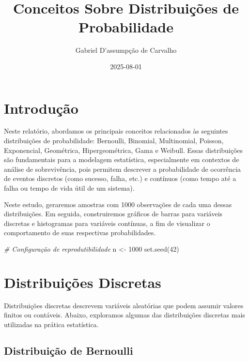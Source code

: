 \documentclass[
]{article}
\title{Conceitos Sobre Distribuições de Probabilidade}
\author{Gabriel D'assumpção de Carvalho}
\date{2025-08-01}
\newenvironment{Shaded}{\begin{snugshade}}{\end{snugshade}}
\newcommand{\CommentTok}[1]{\textcolor[rgb]{0.56,0.35,0.01}{\textit{#1}}}
\newcommand{\DecValTok}[1]{\textcolor[rgb]{0.00,0.00,0.81}{#1}}
\newcommand{\FunctionTok}[1]{\textcolor[rgb]{0.00,0.00,0.00}{#1}}
\newcommand{\NormalTok}[1]{#1}
\newcommand{\OtherTok}[1]{\textcolor[rgb]{0.56,0.35,0.01}{#1}}
\begin{document}
\maketitle

{
\setcounter{tocdepth}{2}
\tableofcontents
}
\newpage

\hypertarget{introduuxe7uxe3o}{%
\section{Introdução}\label{introduuxe7uxe3o}}

Neste relatório, abordamos os principais conceitos relacionados às seguintes distribuições de probabilidade: Bernoulli, Binomial, Multinomial, Poisson, Exponencial, Geométrica, Hipergeométrica, Gama e Weibull. Essas distribuições são fundamentais para a modelagem estatística, especialmente em contextos de análise de sobrevivência, pois permitem descrever a probabilidade de ocorrência de eventos discretos (como sucesso, falha, etc.) e contínuos (como tempo até a falha ou tempo de vida útil de um sistema).

Neste estudo, geraremos amostras com 1000 observações de cada uma dessas distribuições. Em seguida, construiremos gráficos de barras para variáveis discretas e histogramas para variáveis contínuas, a fim de visualizar o comportamento de suas respectivas probabilidades.

\begin{Shaded}
\begin{Highlighting}[]
\CommentTok{\# Configuração de reprodutibilidade}
\NormalTok{n }\OtherTok{\textless{}{-}} \DecValTok{1000}
\FunctionTok{set.seed}\NormalTok{(}\DecValTok{42}\NormalTok{)}
\end{Highlighting}
\end{Shaded}

\hypertarget{distribuiuxe7uxf5es-discretas}{%
\section{Distribuições Discretas}\label{distribuiuxe7uxf5es-discretas}}

Distribuições discretas descrevem variáveis aleatórias que podem assumir valores finitos ou contáveis. Abaixo, exploramos algumas das distribuições discretas mais utilizadas na prática estatística.

\hypertarget{distribuiuxe7uxe3o-de-bernoulli}{%
\subsection{Distribuição de Bernoulli}\label{distribuiuxe7uxe3o-de-bernoulli}}
\end{document}
